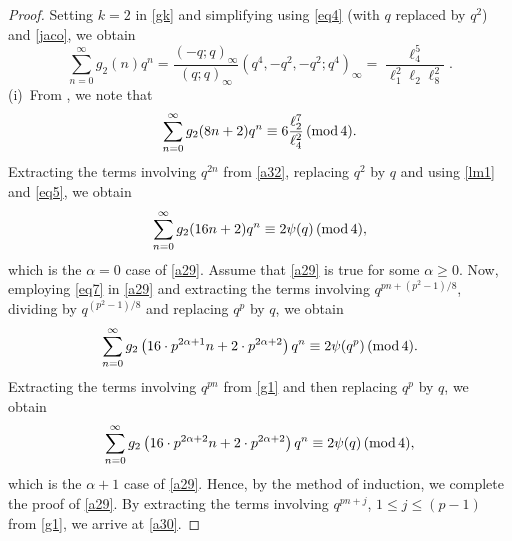 \documentclass[12pt]{article}
\renewcommand{\(}{\left\(}
\renewcommand{\)}{\right\)}
\renewcommand{\[}{\left[}
\renewcommand{\]}{\right]}
\renewcommand{\pmod}[1]{\,(\textup{mod}\,#1)}
\numberwithin{equation}{section}
\theoremstyle{plain}
\begin{document}
\begin{proof}
Setting $k=2$ in \eqref{gk} and simplifying using \eqref{eq4} (with $q$ replaced by $q^2$) and \eqref{jaco}, we obtain
 \begin{equation}\label{e14}
 \sum_{n=0}^{\infty}g_2(n)q^n = \dfrac{(-q;q)_{\infty}}{(q;q)_{\infty}}(q^4,-q^2,-q^2;q^4)_{\infty} = \dfrac{\ell_4^5}{\ell_1^2\ell_2\ell_8^2}.
 \end{equation}
(i)~From \cite[p. 9 Theorem 4]{GM1}, we note that
 \begin{equation}\label{a32}
 \sum_{n=0}^{\infty}g_2(8n+2)q^n \equiv 6\dfrac{\ell_2^7}{\ell_4^2}\pmod{4}.
 \end{equation}Extracting the terms involving $q^{2n}$ from \eqref{a32}, replacing $q^2$ by $q$ and using \eqref{lm1} and \eqref{eq5}, we obtain
 $$\sum_{n=0}^{\infty}g_2(16n+2)q^n \equiv2\psi(q)\pmod{4},$$which is the $\alpha=0$ case of \eqref{a29}. Assume that \eqref{a29} is true for some $\alpha\geq0$. Now, employing \eqref{eq7} in \eqref{a29} and extracting the terms involving $q^{pn+(p^{2}-1)/8}$, dividing by $q^{(p^{2}-1)/8}$ and replacing $q^p$ by $q$, we obtain
   \begin{equation}\label{g1}
   \sum_{n=0}^{\infty}g_2\left(16\cdot p^{2\alpha+1}n+2\cdot p^{2\alpha+2}\right)q^n\equiv2\psi(q^p)\pmod{4}.
   \end{equation} Extracting the terms involving $q^{pn}$ from \eqref{g1} and then replacing $q^p$ by $q$, we obtain
   $$\sum_{n=0}^{\infty}g_2\left(16\cdot p^{2\alpha+2}n+2\cdot p^{2\alpha+2}\right)q^n\equiv2\psi(q)\pmod{4},$$
  which is the $\alpha+1$ case of \eqref{a29}. Hence, by the method of induction, we complete the proof of \eqref{a29}. By extracting the terms involving $q^{pn+j}$, $1\leq j\leq(p-1)$ from \eqref{g1}, we arrive at \eqref{a30}.
 

\end{proof}
\end{document}
